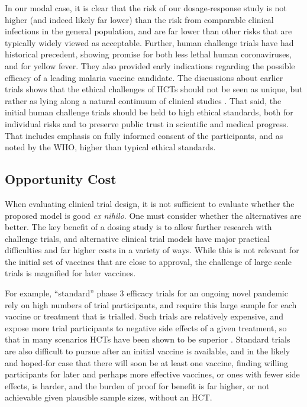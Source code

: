 \documentclass{article}
\begin{document}
In our modal case, it is clear that the risk of our dosage-response study is not higher (and indeed likely far lower) than the risk from comparable clinical infections in the general population, and are far lower than other risks that are typically widely viewed as acceptable. Further, human challenge trials have had historical precedent, showing promise for both less lethal human coronaviruses, and for yellow fever\cite{shah2017ethical}. They also provided early indications regarding the possible efficacy of a leading malaria vaccine candidate\cite{nielsen2018rts}. The discussions about earlier trials shows that the ethical challenges of HCTs should not be seen as unique, but rather as lying along a natural continuum of clinical studies \cite{franklin2001ethical}. That said, the initial human challenge trials should be held to high ethical standards, both for individual risks and to preserve public trust in scientific and medical progress. That includes emphasis on fully informed consent of the participants, and as noted by the WHO, higher than typical ethical standards\cite{world2020key}. 



\subsection{Opportunity Cost}

When evaluating clinical trial design, it is not sufficient to evaluate whether the proposed model is good \textit{ex nihilo}. One must consider whether the alternatives are better. The key benefit of a dosing study is to allow further research with challenge trials, and alternative clinical trial models have major practical difficulties and far higher costs in a variety of ways. While this is not relevant for the initial set of vaccines that are close to approval, the challenge of large scale trials is magnified for later vaccines.

For example, “standard” phase 3 efficacy trials for an ongoing novel pandemic rely on high numbers of trial participants, and require this large sample for each vaccine or treatment that is trialled. Such trials are relatively expensive, and expose more trial participants to negative side effects of a given treatment, so that in many scenarios HCTs have been shown to be superior \cite{berry2020cost}. Standard trials are also difficult to pursue after an initial vaccine is available, and in the likely and hoped-for case that there will soon be at least one vaccine, finding willing participants for later and perhaps more effective vaccines, or ones with fewer side effects, is harder, and the burden of proof for benefit is far higher, or not achievable given plausible sample sizes, without an HCT.
\end{document}
